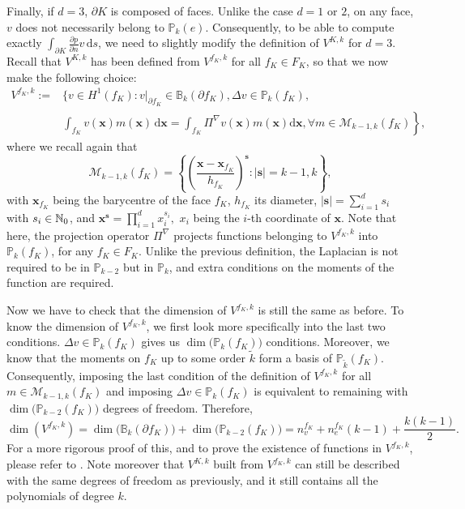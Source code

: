 Finally, if $d=3$, $\partial K$ is composed of faces. Unlike the case $d=1$ or $2$, on any face, $v$ does not necessarily belong to $\mathbb{P}_k(e)$. Consequently, to be able to compute exactly $\int_{\partial K} \frac{\partial p}{\partial n} v \, \mathrm{d}s$, we need to  slightly modify the definition of $V^{K,k}$ for $d=3$. Recall that $V^{K,k}$ has been defined from $V^{f_K,k}$ for all $f_K\in F_K$, so that we now make the following choice:
\begin{align*}
V^{f_K,k} := &\Bigg\{v\in H^1(f_K) : v|_{\partial f_K} \in \mathbb{B}_k(\partial f_K), \Delta v\in \mathbb{P}_{k}(f_K), \\
&\left. \int_{f_K} v(\mathbf{x}) m(\mathbf{x}) \, \mathrm{d}\mathbf{x} = \int_{f_K} \Pi^\nabla v(\mathbf{x}) m(\mathbf{x})\mathrm{d}\mathbf{x}, \forall m\in\mathcal{M}_{k-1,k}(f_K) \right\},
\end{align*}
where we recall again that $$\mathcal{M}_{k-1,k}(f_K) = \left\{\left(\frac{\mathbf{x}- \mathbf{x}_{f_K}}{h_{f_K}}\right)^\mathbf{s} : |\mathbf{s}|= k-1, k\right\},$$ with $\mathbf{x}_{f_K}$ being the barycentre of the face $f_K$, $h_{f_K}$ its diameter, $|\mathbf{s}| = \sum_{i=1}^d s_i$ with $s_i\in \mathbb{N}_0$, and $\mathbf{x}^\mathbf{s}=\prod_{i=1}^d x_i^{s_i},$ $x_i$ being the $i$-th coordinate of $\mathbf{x}$. Note that here, the projection operator $\Pi^\nabla$ projects functions belonging to $V^{f_K,k}$ into $\mathbb{P}_k(f_K)$, for any $f_K\in F_K$. 
Unlike the previous definition, the Laplacian is not required to be in $\mathbb{P}_{k-2}$ but in $\mathbb{P}_k$, and extra conditions on the moments of the function are required.

Now we have to check that the dimension of $V^{f_K,k}$ is still the same as before. 
To know the dimension of $V^{f_K,k}$, we first look more specifically into the last two conditions. $\Delta v\in\mathbb{P}_k(f_K)$ gives us $\dim\big(\mathbb{P}_k(f_K)\big)$ conditions. Moreover, we know that the moments on $f_K$ up to some order $\tilde{k}$ form a basis of $\mathbb{P}_{\tilde{k}}(f_K)$. Consequently, imposing the last condition of the definition of $V^{f_K,k}$ for all $m\in\mathcal{M}_{k-1,k}(f_K)$ and imposing $\Delta v\in\mathbb{P}_k(f_K)$ is equivalent to remaining with $\dim\big(\mathbb{P}_{k-2}(f_K)\big)$ degrees of freedom. Therefore, 
$$\dim\left(V^{f_K,k}\right) = \dim\big(\mathbb{B}_k\left(\partial f_K\right)\big)+\dim\big(\mathbb{P}_{k-2}(f_K)\big)= n_v^{f_K} + n_e^{f_K}(k-1) + \frac{k(k-1)}{2}.$$
For a more rigorous proof of this, and to prove the existence of functions in $V^{f_K,k}$, please refer to \cite{existenceW}. Note moreover that $V^{K,k}$ built from $V^{f_K,k}$ can still be described with the same degrees of freedom as previously, and it still contains all the polynomials of degree $k$. 

